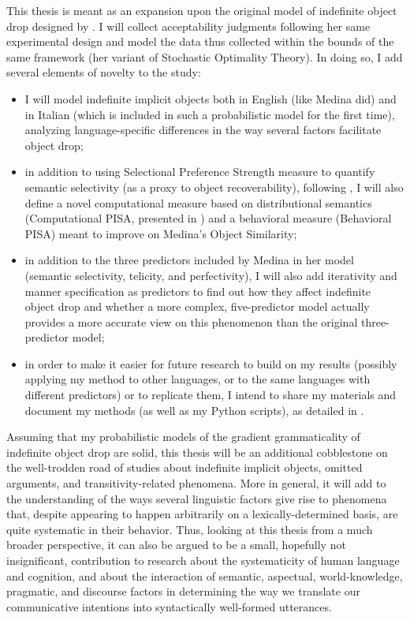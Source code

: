 This thesis is meant as an expansion upon the original model of indefinite object drop designed by \textcite{Medina2007}. I will collect acceptability judgments following her same experimental design and model the data thus collected within the bounds of the same framework (her variant of Stochastic Optimality Theory). In doing so, I add several elements of novelty to the study:
\begin{itemize}
    \item I will model indefinite implicit objects both in English (like Medina did) and in Italian (which is included in such a probabilistic model for the first time), analyzing language-specific differences in the way several factors facilitate object drop;
    \item in addition to using  Selectional Preference Strength measure to quantify semantic selectivity (as a proxy to object recoverability), following \textcite{Medina2007}, I will also define a novel computational measure based on distributional semantics (Computational PISA, presented in \textcite{CappelliLenciPISA}) and a behavioral measure (Behavioral PISA) meant to improve on Medina's Object Similarity;
    \item in addition to the three predictors included by Medina in her model (semantic selectivity, telicity, and perfectivity), I will also add iterativity and manner specification as predictors to find out how they affect indefinite object drop and whether a more complex, five-predictor model actually provides a more accurate view on this phenomenon than the original three-predictor model;
    \item in order to make it easier for future research to build on my results (possibly applying my method to other languages, or to the same languages with different predictors) or to replicate them, I intend to share my materials and document my methods (as well as my Python scripts), as detailed in .
\end{itemize}

Assuming that my probabilistic models of the gradient grammaticality of indefinite object drop are solid, this thesis will be an additional cobblestone on the well-trodden road of studies about indefinite implicit objects, omitted arguments, and transitivity-related phenomena. More in general, it will add to the understanding of the ways several linguistic factors give rise to phenomena that, despite appearing to happen arbitrarily on a lexically-determined basis, are quite systematic in their behavior. Thus, looking at this thesis from a much broader perspective, it can also be argued to be a small, hopefully not insignificant, contribution to research about the systematicity of human language and cognition, and about the interaction of semantic, aspectual, world-knowledge, pragmatic, and discourse factors in determining the way we translate our communicative intentions into syntactically well-formed utterances.


